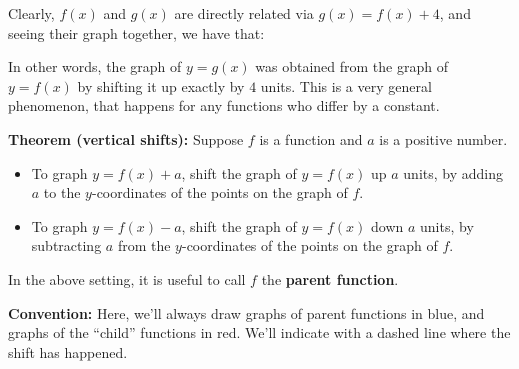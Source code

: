 \documentclass{ximera}
\begin{document}
 Clearly, $f(x)$ and $g(x)$ are directly related via $g(x) = f(x)+4$, and seeing their graph together, we have that:

   \begin{image}
 \end{image}

In other words, the graph of $y=g(x)$ was obtained from the graph of $y=f(x)$ by shifting it up exactly by $4$ units. This is a very general phenomenon, that happens for any functions who differ by a constant.

\begin{callout}
  {\bf Theorem (vertical shifts):} Suppose $f$ is a function and $a$ is a positive number.
  \begin{itemize}
  \item To graph $y = f(x)+a$, shift the graph of $y=f(x)$ up $a$ units, by adding $a$ to the $y$-coordinates of the points on the graph of $f$.
      \item To graph $y = f(x)-a$, shift the graph of $y=f(x)$ down $a$ units, by subtracting $a$ from the $y$-coordinates of the points on the graph of $f$.
  \end{itemize}
\end{callout}

In the above setting, it is useful to call $f$ the {\bf parent function}.

\begin{callout}
  {\bf Convention:} Here, we'll always draw graphs of parent functions in blue, and graphs of the ``child'' functions in red. We'll indicate with a dashed line where the shift has happened.
\end{callout}
\end{document}
